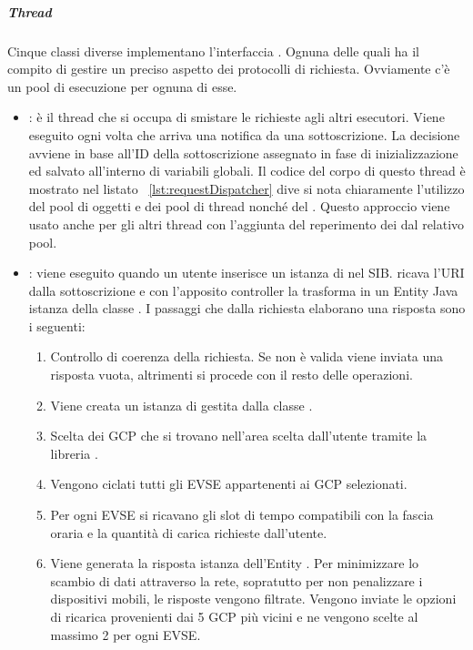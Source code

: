 \subparagraph{Thread}\label{par:thread}

Cinque classi diverse implementano l'interfaccia . Ognuna delle quali ha il compito di gestire un preciso aspetto dei protocolli di richiesta. Ovviamente c'è un pool di esecuzione per ognuna di esse.

\begin{itemize}
	\item {}: è il thread che si occupa di smistare le richieste agli altri esecutori. Viene eseguito ogni volta che arriva una notifica da una sottoscrizione. La decisione avviene in base all'ID della sottoscrizione assegnato in fase di inizializzazione ed salvato all'interno di variabili globali. Il codice del corpo di questo thread è mostrato nel listato ~\ref{lst:requestDispatcher} dive si nota chiaramente l'utilizzo del pool di oggetti e dei pool di thread nonché del . Questo approccio viene usato anche per gli altri thread con l'aggiunta del reperimento dei  dal relativo pool.
	\item {}: viene eseguito quando un utente inserisce un istanza di  nel SIB. ricava l'URI dalla sottoscrizione e con l'apposito controller  la trasforma in un Entity Java istanza della classe . I passaggi che dalla richiesta elaborano una risposta sono i seguenti:
	\begin{enumerate}
		\item Controllo di coerenza della richiesta. Se non è valida viene inviata una risposta vuota, altrimenti si procede con il resto delle operazioni.
		\item Viene creata un istanza di  gestita dalla classe .
		\item Scelta dei GCP che si trovano nell'area scelta dall'utente tramite la libreria .
		\item Vengono ciclati tutti gli EVSE appartenenti ai GCP selezionati.
		\item Per ogni EVSE si ricavano gli slot di tempo compatibili con la fascia oraria e la quantità di carica richieste dall'utente.
		\item Viene generata la risposta istanza dell'Entity . Per minimizzare lo scambio di dati attraverso la rete, sopratutto per non penalizzare i dispositivi mobili, le risposte vengono filtrate. Vengono inviate le opzioni di ricarica provenienti dai 5 GCP più vicini e ne vengono scelte al massimo 2 per ogni EVSE.

\end{enumerate}
\end{itemize}
